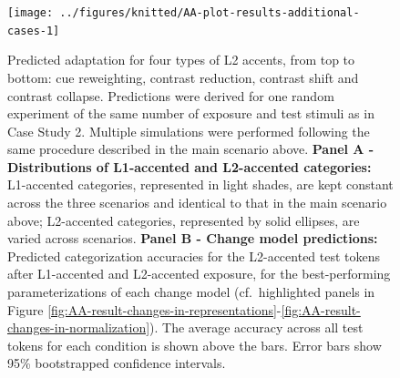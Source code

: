 \documentclass[
  11pt,
  man,floatsintext]{apa6}
\begin{document}
\begin{figure}

{\centering \texttt{[image: ../figures/knitted/AA-plot-results-additional-cases-1]} 

}

\caption{Predicted adaptation for four types of L2 accents, from top to bottom: cue reweighting, contrast reduction, contrast shift and contrast collapse. Predictions were derived for one random experiment of the same number of exposure and test stimuli as in Case Study 2. Multiple simulations were performed following the same procedure described in the main scenario above. \textbf{Panel A - Distributions of L1-accented and L2-accented categories:} L1-accented categories, represented in light shades, are kept constant across the three scenarios and identical to that in the main scenario above; L2-accented categories, represented by solid ellipses, are varied across scenarios. \textbf{Panel B - Change model predictions:} Predicted categorization accuracies for the L2-accented test tokens after L1-accented and L2-accented exposure, for the best-performing parameterizations of each change model (cf.~highlighted panels in Figure \ref{fig:AA-result-changes-in-representations}-\ref{fig:AA-result-changes-in-normalization}). The average accuracy across all test tokens for each condition is shown above the bars. Error bars show 95\% bootstrapped confidence intervals.}\label{fig:AA-plot-results-additional-cases}
\end{figure}

\begin{table}
\centering
\caption{\label{tab:AA-table-best-performing-parameterization}Best-performing parameterizations across different accent scenarios. Recall that best-performing here refers to the parameterization that achieves the highest accuracy on L2-accented test tokens, rather than best quantitative fit against human data (which we do not have).}
\centering
{}
\end{table}
\end{document}
